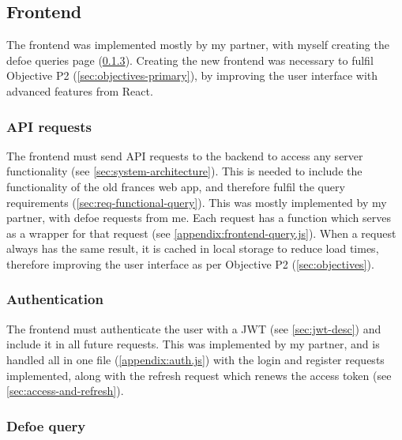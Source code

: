 \documentclass[12pt, letterpaper]{article}
\begin{document}
\subsection{Frontend}\label{sec:impl-frontend}

\begin{flushleft}
The frontend was implemented mostly by my partner, with myself creating the defoe queries page (\ref{sec:impl-frontend-defoe}). Creating the new frontend was necessary to fulfil Objective P2 (\ref{sec:objectives-primary}), by improving the user interface with advanced features from React.
\end{flushleft}

\subsubsection{API requests}\label{sec:impl-frontend-api}

\begin{flushleft}
The frontend must send API requests to the backend to access any server functionality (see \ref{sec:system-architecture}). This is needed to include the functionality of the old frances web app, and therefore fulfil the query requirements (\ref{sec:req-functional-query}). This was mostly implemented by my partner, with defoe requests from me. Each request has a function which serves as a wrapper for that request (see \ref{appendix:frontend-query.js}). When a request always has the same result, it is cached in local storage to reduce load times, therefore improving the user interface as per Objective P2 (\ref{sec:objectives}).
\end{flushleft}

\subsubsection{Authentication}\label{sec:impl-frontend-auth}

\begin{flushleft}
The frontend must authenticate the user with a JWT (see \ref{sec:jwt-desc}) and include it in all future requests. This was implemented by my partner, and is handled all in one file (\ref{appendix:auth.js}) with the login and register requests implemented, along with the refresh request which renews the access token (see \ref{sec:access-and-refresh}).
\end{flushleft}

\subsubsection{Defoe query}\label{sec:impl-frontend-defoe}
\end{document}

